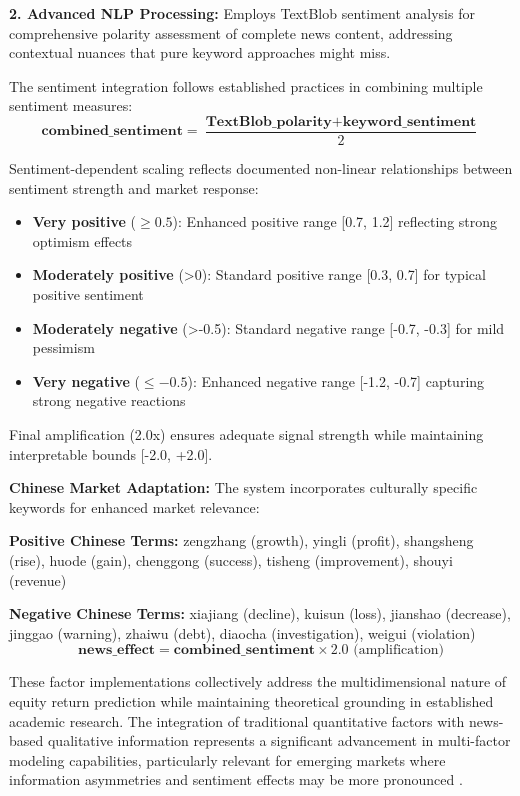 \documentclass[3p,times,procedia]{elsarticle}
\begin{document}
\textbf{2. Advanced NLP Processing:} Employs TextBlob sentiment analysis for comprehensive polarity assessment of complete news content, addressing contextual nuances that pure keyword approaches might miss.

The sentiment integration follows established practices in combining multiple sentiment measures:
\begin{equation}
    \textbf{combined\_sentiment} = \frac{\textbf{TextBlob\_polarity} + \textbf{keyword\_sentiment}}{2}
\end{equation}
\vspace{0.2cm}

Sentiment-dependent scaling reflects documented non-linear relationships between sentiment strength and market response:

\begin{itemize}
    \item \textbf{Very positive} ($\geq 0.5$): Enhanced positive range [0.7, 1.2] reflecting strong optimism effects
    \item \textbf{Moderately positive} (>0): Standard positive range [0.3, 0.7] for typical positive sentiment
    \item \textbf{Moderately negative} (>-0.5): Standard negative range [-0.7, -0.3] for mild pessimism
    \item \textbf{Very negative} ($\leq -0.5$): Enhanced negative range [-1.2, -0.7] capturing strong negative reactions
\end{itemize}

Final amplification (2.0x) ensures adequate signal strength while maintaining interpretable bounds [-2.0, +2.0].

\textbf{Chinese Market Adaptation:} The system incorporates culturally specific keywords for enhanced market relevance:

\textbf{Positive Chinese Terms:} zengzhang (growth), yingli (profit), shangsheng (rise), huode (gain), chenggong (success), tisheng (improvement), shouyi (revenue)

\textbf{Negative Chinese Terms:} xiajiang (decline), kuisun (loss), jianshao (decrease), jinggao (warning), zhaiwu (debt), diaocha (investigation), weigui (violation)
\vspace{-0.1cm}
\begin{equation}
\textbf{news\_effect} = \textbf{combined\_sentiment} \times 2.0 \text{ (amplification)}
\end{equation}

These factor implementations collectively address the multidimensional nature of equity return prediction while maintaining theoretical grounding in established academic research. The integration of traditional quantitative factors with news-based qualitative information represents a significant advancement in multi-factor modeling capabilities, particularly relevant for emerging markets where information asymmetries and sentiment effects may be more pronounced \cite{Harvey2016}.
\end{document}
